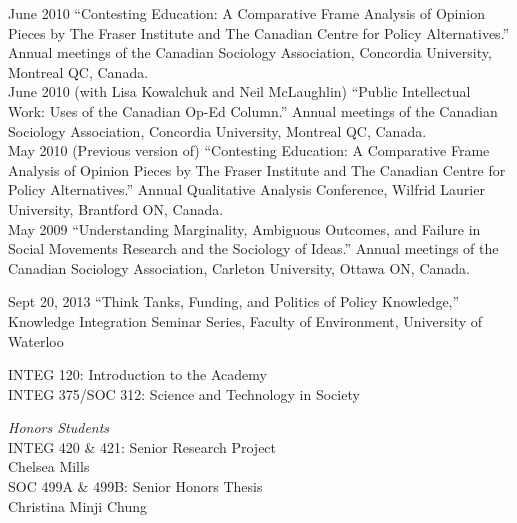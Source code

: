 \documentclass[11pt,usenames,dvipsnames]{article}
\begin{document}
\ind June 2010 ``Contesting Education: A Comparative Frame Analysis of Opinion Pieces by The Fraser Institute and The Canadian Centre for Policy Alternatives.'' Annual meetings  of the Canadian Sociology Association, Concordia University, Montreal QC, Canada.\\

\ind June 2010 (with Lisa Kowalchuk and Neil McLaughlin) ``Public Intellectual Work: Uses of the Canadian Op-Ed Column.'' Annual meetings of the Canadian Sociology Association, Concordia University, Montreal QC, Canada.\\

\ind May 2010 (Previous version of) ``Contesting Education: A Comparative Frame Analysis of Opinion Pieces by The Fraser Institute and The Canadian Centre for Policy Alternatives.'' Annual Qualitative Analysis Conference, Wilfrid Laurier University, Brantford ON, Canada.\\

\ind May 2009 ``Understanding Marginality, Ambiguous Outcomes, and Failure in Social Movements Research and the Sociology of Ideas.'' Annual meetings of the Canadian Sociology Association, Carleton University, Ottawa ON, Canada.\\


\ind Sept 20, 2013 ``Think Tanks, Funding, and Politics of Policy Knowledge,'' Knowledge Integration Seminar Series, Faculty of Environment, University of Waterloo \\


\noindent INTEG 120: Introduction to the Academy \\
\noindent INTEG 375/SOC 312: Science and Technology in Society \\


\noindent \emph{Honors Students} \\

\noindent INTEG 420 \& 421: Senior Research Project \\
\noindent Chelsea Mills \\

\noindent SOC 499A \& 499B: Senior Honors Thesis \\
\noindent Christina Minji Chung \\


\end{document}
